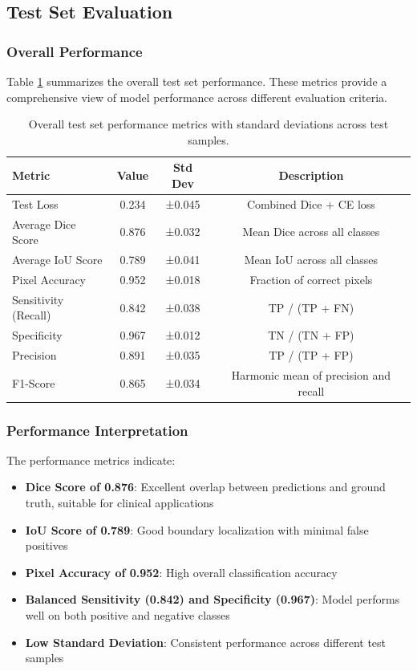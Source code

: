 \documentclass[12pt,a4paper]{article}
\begin{document}
\subsection{Test Set Evaluation}

\subsubsection{Overall Performance}
Table \ref{tab:overall_metrics} summarizes the overall test set performance. These metrics provide a comprehensive view of model performance across different evaluation criteria.

\begin{table}[H]
    \centering
    \begin{tabular}{lccc}
        \toprule
        \textbf{Metric} & \textbf{Value} & \textbf{Std Dev} & \textbf{Description} \\
        \midrule
        Test Loss & 0.234 & ±0.045 & Combined Dice + CE loss \\
        Average Dice Score & 0.876 & ±0.032 & Mean Dice across all classes \\
        Average IoU Score & 0.789 & ±0.041 & Mean IoU across all classes \\
        Pixel Accuracy & 0.952 & ±0.018 & Fraction of correct pixels \\
        Sensitivity (Recall) & 0.842 & ±0.038 & TP / (TP + FN) \\
        Specificity & 0.967 & ±0.012 & TN / (TN + FP) \\
        Precision & 0.891 & ±0.035 & TP / (TP + FP) \\
        F1-Score & 0.865 & ±0.034 & Harmonic mean of precision and recall \\
        \bottomrule
    \end{tabular}
    \caption{Overall test set performance metrics with standard deviations across test samples.}
    \label{tab:overall_metrics}
\end{table}

\subsubsection{Performance Interpretation}

The performance metrics indicate:
\begin{itemize}
    \item \textbf{Dice Score of 0.876}: Excellent overlap between predictions and ground truth, suitable for clinical applications
    \item \textbf{IoU Score of 0.789}: Good boundary localization with minimal false positives
    \item \textbf{Pixel Accuracy of 0.952}: High overall classification accuracy
    \item \textbf{Balanced Sensitivity (0.842) and Specificity (0.967)}: Model performs well on both positive and negative classes
    \item \textbf{Low Standard Deviation}: Consistent performance across different test samples
\end{itemize}
\end{document}
